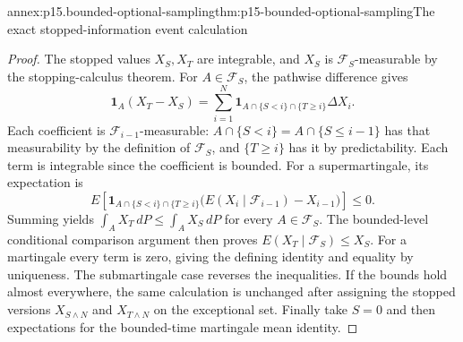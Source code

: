 \begin{annexitem}{annex:p15.bounded-optional-sampling}{thm:p15-bounded-optional-sampling}{The exact stopped-information event calculation}
\begin{proof}
The stopped values \(X_S,X_T\) are integrable, and \(X_S\) is
\(\mathcal F_S\)-measurable by the stopping-calculus theorem.
For \(A\in\mathcal F_S\), the pathwise difference gives
\[
       \mathbf1_A(X_T-X_S)
              =\sum_{i=1}^N
                     \mathbf1_{A\cap\{S<i\}\cap\{T\geq i\}}\Delta X_i.
\]
Each coefficient is \(\mathcal F_{i-1}\)-measurable:
\(A\cap\{S<i\}=A\cap\{S\leq i-1\}\) has that measurability
by the definition of \(\mathcal F_S\), and \(\{T\geq i\}\)
has it by predictability.
Each term is integrable since the coefficient is bounded.
For a supermartingale, its expectation is
\[
 E\left[
 \mathbf1_{A\cap\{S<i\}\cap\{T\geq i\}}
       \bigl(E(X_i\mid\mathcal F_{i-1})-X_{i-1}\bigr)\right]\leq0.
\]
Summing yields \(\int_AX_T\,dP\leq\int_AX_S\,dP\) for every
\(A\in\mathcal F_S\).
The bounded-level conditional comparison argument then proves
\(E(X_T\mid\mathcal F_S)\leq X_S\).
For a martingale every term is zero, giving the defining identity
and equality by uniqueness.
The submartingale case reverses the inequalities.
If the bounds hold almost everywhere, the same calculation is
unchanged after assigning the stopped versions \(X_{S\wedge N}\)
and \(X_{T\wedge N}\) on the exceptional set.
Finally take \(S=0\) and then expectations for the bounded-time
martingale mean identity.
\end{proof}
\end{annexitem}

